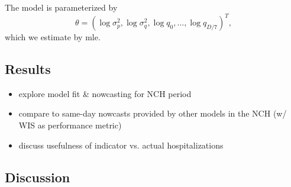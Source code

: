 The model is parameterized by 
$$
    \theta = \left( \log \sigma^{2}_{p}, \log \sigma_{q}^{2}, \log q_{0}, \dots, \log q_{D / 7} \right)^{T},
$$
which we estimate by \acrshort{mle}. 


\subsection{Results}

\begin{itemize}
    \item explore model fit \& nowcasting for NCH period
    \item compare to same-day nowcasts provided by other models in the NCH (w/ WIS as performance metric)
    \item discuss usefulness of indicator vs. actual hospitalizations
\end{itemize}

\subsection{Discussion}